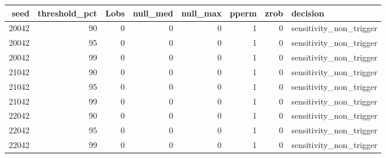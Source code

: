 \begin{tabular}{rrrrrrrl}
\toprule
seed & threshold_pct & Lobs & null_med & null_max & pperm & zrob & decision \\
\midrule
20042 & 90 & 0 & 0 & 0 & 1 & 0 & sensitivity_non_trigger \\
20042 & 95 & 0 & 0 & 0 & 1 & 0 & sensitivity_non_trigger \\
20042 & 99 & 0 & 0 & 0 & 1 & 0 & sensitivity_non_trigger \\
21042 & 90 & 0 & 0 & 0 & 1 & 0 & sensitivity_non_trigger \\
21042 & 95 & 0 & 0 & 0 & 1 & 0 & sensitivity_non_trigger \\
21042 & 99 & 0 & 0 & 0 & 1 & 0 & sensitivity_non_trigger \\
22042 & 90 & 0 & 0 & 0 & 1 & 0 & sensitivity_non_trigger \\
22042 & 95 & 0 & 0 & 0 & 1 & 0 & sensitivity_non_trigger \\
22042 & 99 & 0 & 0 & 0 & 1 & 0 & sensitivity_non_trigger \\
\bottomrule
\end{tabular}
